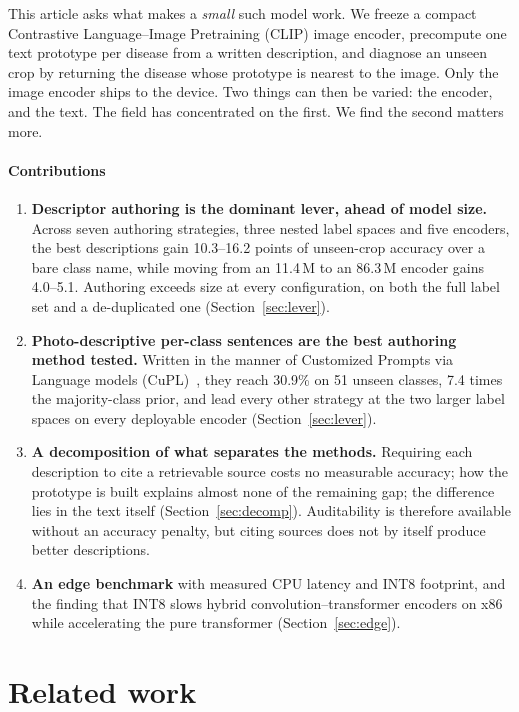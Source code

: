\documentclass[a4paper,fleqn]{cas-dc}
\begin{document}
This article asks what makes a \emph{small} such model work. We freeze a compact Contrastive
Language--Image Pretraining (CLIP) image encoder, precompute one text prototype per disease from a
written description, and diagnose an unseen crop by returning the disease whose prototype is nearest
to the image. Only the image encoder ships to the device. Two things can then be varied: the encoder,
and the text. The field has concentrated on the first. We find the second matters more.

\paragraph{Contributions}
\begin{enumerate}
\item \textbf{Descriptor authoring is the dominant lever, ahead of model size.} Across seven
authoring strategies, three nested label spaces and five encoders, the best descriptions gain
10.3--16.2 points of unseen-crop accuracy over a bare class name, while moving from an 11.4\,M to an
86.3\,M encoder gains 4.0--5.1. Authoring exceeds size at every configuration, on both the full label
set and a de-duplicated one (Section~\ref{sec:lever}).
\item \textbf{Photo-descriptive per-class sentences are the best authoring method tested.} Written
in the manner of Customized Prompts via Language models (CuPL)~\citep{pratt2023}, they reach 30.9\% on
51 unseen classes, 7.4 times the majority-class prior, and lead every other strategy at the two
larger label spaces on every deployable encoder (Section~\ref{sec:lever}).
\item \textbf{A decomposition of what separates the methods.} Requiring each description to cite a
retrievable source costs no measurable accuracy; how the prototype is built explains almost none of
the remaining gap; the difference lies in the text itself (Section~\ref{sec:decomp}). Auditability
is therefore available without an accuracy penalty, but citing sources does not by itself produce
better descriptions.
\item \textbf{An edge benchmark} with measured CPU latency and INT8 footprint, and the finding that
INT8 slows hybrid convolution--transformer encoders on x86 while accelerating the pure transformer
(Section~\ref{sec:edge}).
\end{enumerate}

\section{Related work}
\label{sec:related}
\end{document}
